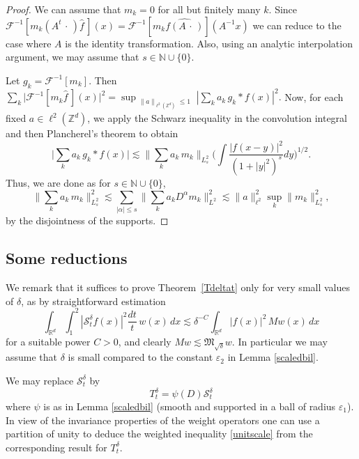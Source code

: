 \documentclass[11pt]{amsart}
\theoremstyle{definition}
\numberwithin{theorem}{section}
\numberwithin{definition}{section}
\newcommand{\Be}{\begin{equation}}
\newcommand{\Ee}{\end{equation}}
\newcommand{\note}[1]{\footnote{\texttt{\Small #1}}}
\def\lc{\lesssim}
\def\eps{\varepsilon}
\def\fM{{\mathfrak {M}}}
\def\bbN{{\mathbb {N}}}
\def\bbR{{\mathbb {R}}}
\def\bbZ{{\mathbb {Z}}}
\def\cF{{\mathcal {F}}}
\def\cS{{\mathcal {S}}}
\begin{document}
\begin{proof}
We can assume that $m_k=0$ for all but
finitely many $k$.
Since
$\cF^{-1}[m_k(A^{t}\,\cdot\,)
  \widehat f \,](x)=
\cF^{-1}[m_k
  \widehat {f(A\,\cdot\,)}](A^{-1}x)$
we can reduce to the case where 
$A$ is the identity transformation.
Also, using an  analytic interpolation argument, we may assume that $s\in \bbN\cup\{0\}$.



Let  $g_k = \cF^{-1}[m_k]$. Then
$\sum_{k}\big|\cF^{-1}[m_k  \widehat f \,](x)\big|^2
= \sup_{\substack {\|a\|_{\ell^2(\bbZ^d)}\le 1}}
|\sum_k a_k  \, g_k *f(x)|^2.$
Now, for each fixed $a\in \ell^2(\bbZ^d)$, we  apply  the Schwarz inequality in the convolution integral and then Plancherel's theorem to obtain
$$
\Big|\sum_k a_k  \,g_k*f (x)\big|
\lc\Big\|\sum_k a_k  \, m_k\Big\|_{L^2_s} \Big(\int
\frac{|f(x-y)|^2}{(1+|y|^{2})^{s}} dy \Big)^{1/2}.
$$
Thus, we are done as for $s\in \bbN\cup\{0\}$,
\begin{equation*}\label{sob}
\Big\|\sum_k a_k  \, m_k\Big\|^2_{L^2_s}\lc\sum_{|\alpha|\le
s}\Big\|\sum_k a_kD^\alpha\!m_k\Big\|^2_{L^2}\lc \|a\|^2_{\ell^2}\sup_k \|m_k\|^2_{L^2_s},
\end{equation*}
by the disjointness of the supports.
\end{proof}


\subsection*{Some reductions}
We remark that it suffices to prove   Theorem~\ref{Tdeltat}
only for very small values of $\delta$, as by straightforward estimation
$$
\int_{\bbR^d}\int_{1}^2|\cS^\delta_tf(x)|^2\frac{dt}{t}\, w(x)\,dx
\lc \delta^{-C} \int_{\bbR^d} |f(x)|^2\,Mw(x) \,dx
$$
for a suitable power $C>0$,  and clearly
$Mw\lc \fM_{\sqrt\delta}w$. In particular we may assume that $\delta$ is small compared to the constant $\eps_2$  in Lemma \ref{scaledbil}.

We may   replace $\cS^\delta_t$  by
\Be\label{Tdeltadef}
T^\delta_t = \psi(D)
\cS^\delta_t
\Ee
where $\psi$ is as in Lemma \ref{scaledbil} (smooth and supported in a ball of radius $\eps_1$).
In view of the  invariance  properties  of the weight operators one can
 use a partition of unity to deduce the weighted inequality
\eqref{unitscale} from the corresponding result for $T^\delta_t$.
\end{document}
